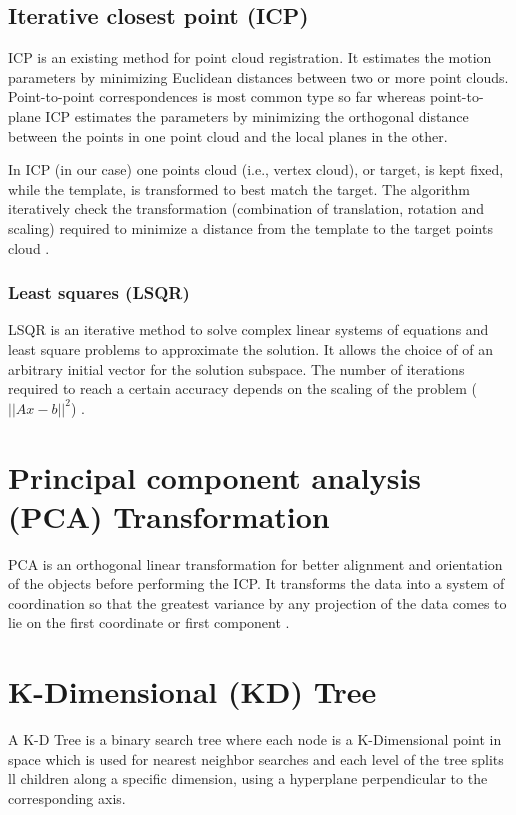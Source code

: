 \documentclass[../structure.tex]{subfiles}
\begin{document}
		\subsection{Iterative closest point (ICP)}
		
		ICP is an existing method for point cloud registration.  It estimates the motion parameters by minimizing Euclidean distances between two or more point clouds. Point-to-point correspondences is most common type so far whereas point-to-plane ICP estimates the parameters by minimizing the orthogonal distance between the points in one point cloud and the local planes in the other.
		
In ICP (in our case) one points cloud (i.e., vertex cloud), or target, is kept fixed, while the template, is transformed to best match the target. The algorithm iteratively check the transformation (combination of translation, rotation and scaling) required to minimize a distance from the template to the target points cloud \cite{Zhang1994}. 

		 \subsubsection{Least squares (LSQR)}
		 
		 LSQR is an iterative method to solve complex linear systems of equations and least square problems to approximate the solution. It allows the choice of of an arbitrary initial vector for the solution subspace. The number of iterations required to reach a certain accuracy depends on the scaling of the problem ($ ||Ax-b||^2 $)  \cite{Paige1982}.

\section{Principal component analysis (PCA) Transformation}

PCA is an orthogonal linear transformation for better alignment and orientation of the objects before performing the ICP.  It transforms the data into a system of coordination so that the greatest variance by any projection of the data comes to lie on the first coordinate or first component \cite{Jolliffe2002}.


\section{K-Dimensional (KD) Tree}

A K-D Tree is a binary search tree where each node is a K-Dimensional point in space which is used for nearest neighbor searches and each level of the tree splits ll children along a specific dimension, using a hyperplane perpendicular to the corresponding axis.



\end{document}
